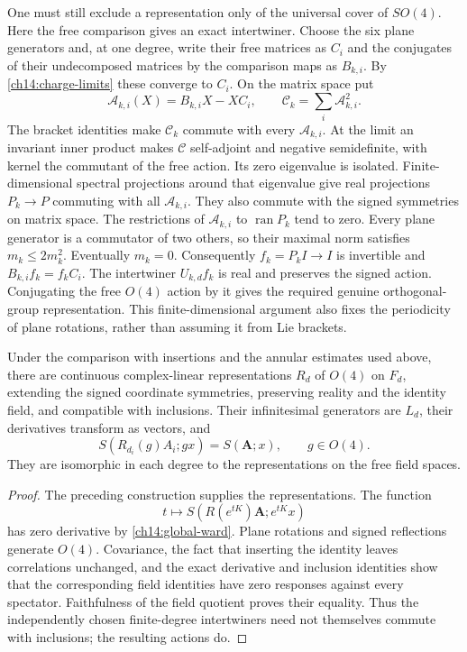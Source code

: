 One must still exclude a representation only of the universal cover
of $SO(4)$. Here the free comparison gives an exact intertwiner.
Choose the six plane generators and, at one degree, write their free
matrices as $C_i$ and the conjugates of their undecomposed matrices by the comparison maps as $B_{k,i}$.
By \eqref{ch14:charge-limits} these converge to $C_i$. On the matrix
space put
\[
 \mathcal A_{k,i}(X)=B_{k,i}X-XC_i,
 \qquad \mathcal C_k=\sum_i\mathcal A_{k,i}^2.
\]
The bracket identities make $\mathcal C_k$ commute with every
$\mathcal A_{k,i}$. At the limit an invariant inner product makes
$\mathcal C$ self-adjoint and negative semidefinite, with kernel
the commutant of the free action. Its zero eigenvalue is isolated.
Finite-dimensional spectral projections around that eigenvalue give
real projections $P_k\to P$ commuting with all $\mathcal A_{k,i}$.
They also commute with the signed symmetries on matrix space.
The restrictions of $\mathcal A_{k,i}$ to $\operatorname{ran}P_k$
tend to zero. Every plane generator is a commutator of two others,
so their maximal norm satisfies $m_k\le2m_k^2$. Eventually $m_k=0$.
Consequently $f_k=P_kI\to I$ is invertible and
$B_{k,i}f_k=f_kC_i$. The intertwiner $U_{k,d}f_k$ is real and
preserves the signed action. Conjugating the free $O(4)$ action by
it gives the required genuine orthogonal-group representation.
This finite-dimensional argument also fixes the periodicity of
plane rotations, rather than assuming it from Lie brackets.

\begin{theorem}\label{ch14:rotations}
Under the comparison with insertions and the annular estimates used above,
there are continuous complex-linear representations $R_d$ of $O(4)$
on $F_d$, extending the signed coordinate symmetries,
preserving reality and the identity field, and compatible with inclusions.
Their infinitesimal generators are $L_d$, their derivatives transform
as vectors, and
\[
 S(R_{d_i}(g)A_i;gx)=S(\boldsymbol A;x),\qquad g\in O(4).
\]
They are isomorphic in each degree to the representations on the free field spaces.
\end{theorem}

\begin{proof}
The preceding construction supplies the representations. The function
\[
 t\longmapsto S(R(e^{tK})\boldsymbol A;e^{tK}x)
\]
has zero derivative by \eqref{ch14:global-ward}. Plane rotations and
signed reflections
generate $O(4)$. Covariance, the fact that inserting the identity leaves correlations unchanged,
and the exact derivative and inclusion identities show that the corresponding field identities
have zero responses against every spectator. Faithfulness of the
field quotient proves their equality. Thus the independently chosen
finite-degree intertwiners need not themselves commute with inclusions;
the resulting actions do.
\end{proof}

